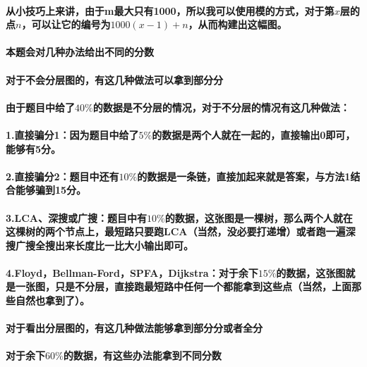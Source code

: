\documentclass[final,11pt,oneside,UTF8]{report}
\begin{document}
\paragraph{从小技巧上来讲，由于m最大只有1000，所以我可以使用模的方式，对于第$x$层的点$n$，可以让它的编号为$1000(x-1)+n$，从而构建出这幅图。}
\paragraph{本题会对几种办法给出不同的分数}
\paragraph{对于不会分层图的，有这几种做法可以拿到部分分}
\paragraph{由于题目中给了$40\%$的数据是不分层的情况，对于不分层的情况有这几种做法：}
\paragraph{1.直接骗分1：因为题目中给了$5\%$的数据是两个人就在一起的，直接输出0即可，能够有5分。}
\paragraph{2.直接骗分2：题目中还有$10\%$的数据是一条链，直接加起来就是答案，与方法1结合能够骗到15分。}
\paragraph{3.LCA、深搜或广搜：题目中有$10\%$的数据，这张图是一棵树，那么两个人就在这棵树的两个节点上，最短路只要跑LCA（当然，没必要打递增）或者跑一遍深搜广搜全搜出来长度比一比大小输出即可。}
\paragraph{4.Floyd，Bellman-Ford，SPFA，Dijkstra：对于余下$15\%$的数据，这张图就是一张图，只是不分层，直接跑最短路中任何一个都能拿到这些点（当然，上面那些自然也拿到了）。}
\paragraph{对于看出分层图的，有这几种做法能够拿到部分分或者全分}
\paragraph{对于余下$60\%$的数据，有这些办法能拿到不同分数}
\end{document}
